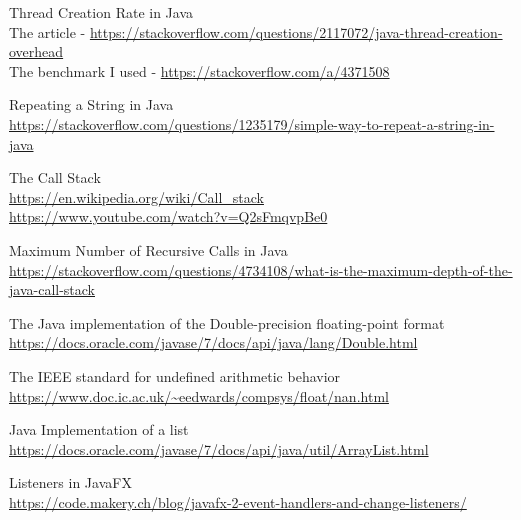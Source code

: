 \documentclass[../../main.tex]{subfiles}
\begin{document}
\begin{thebibliography}{9}
Thread Creation Rate in Java\\
The article - \url{https://stackoverflow.com/questions/2117072/java-thread-creation-overhead}\\
The benchmark I used - \url{https://stackoverflow.com/a/4371508}

Repeating a String in Java\\
\url{https://stackoverflow.com/questions/1235179/simple-way-to-repeat-a-string-in-java}

The Call Stack\\
\url{https://en.wikipedia.org/wiki/Call_stack}\\
\url{https://www.youtube.com/watch?v=Q2sFmqvpBe0}

Maximum Number of Recursive Calls in Java\\
\url{https://stackoverflow.com/questions/4734108/what-is-the-maximum-depth-of-the-java-call-stack}

The Java implementation of the Double-precision floating-point format\\
\url{https://docs.oracle.com/javase/7/docs/api/java/lang/Double.html}

The IEEE standard for undefined arithmetic behavior\\
\url{https://www.doc.ic.ac.uk/~eedwards/compsys/float/nan.html}

Java Implementation of a list\\
\url{https://docs.oracle.com/javase/7/docs/api/java/util/ArrayList.html}

Listeners in JavaFX\\
\url{https://code.makery.ch/blog/javafx-2-event-handlers-and-change-listeners/}
\end{thebibliography}
\end{document}
